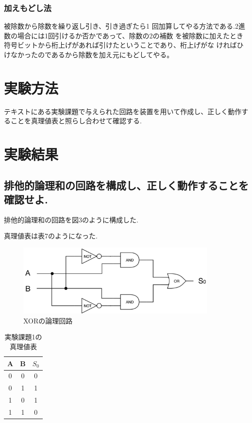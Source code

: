 \documentclass[titlepage]{jsarticle}
\theoremstyle{definition}
\begin{document}
\subsubsection{加えもどし法}
被除数から除数を繰り返し引き、引き過ぎたら1 回加算してやる方法である.2進数の場合には1回引けるか否かであって、除数の2の補数
を被除数に加えたとき符号ビットから桁上げがあれば引けたということであり、桁上げがな
ければひけなかったのであるから除数を加え元にもどしてやる。



\section{実験方法}
テキストにある実験課題で与えられた回路を装置を用いて作成し、正しく動作することを真理値表と照らし合わせて確認する.


\section{実験結果}

\subsection{排他的論理和の回路を構成し、正しく動作することを確認せよ.}
排他的論理和の回路を図3のように構成した.


真理値表は表7のようになった.


\begin{figure}[htbp]
	\begin{center}
		\includegraphics[width=100mm]{work1.png}
		\caption{XORの論理回路}
	\end{center}
\end{figure}



\begin{table}[htbp]
	\caption{実験課題1の真理値表}
	\centering
	\begin{tabular}{|c|c||c|} \hline
    	A & B & $S_0$ \\ \hline \hline
		0 & 0 & 0 \\ \hline
		0 & 1 & 1 \\ \hline
		1 & 0 & 1 \\ \hline
		1 & 1 & 0 \\ \hline
	\end{tabular}
\end{table}
\end{document}

